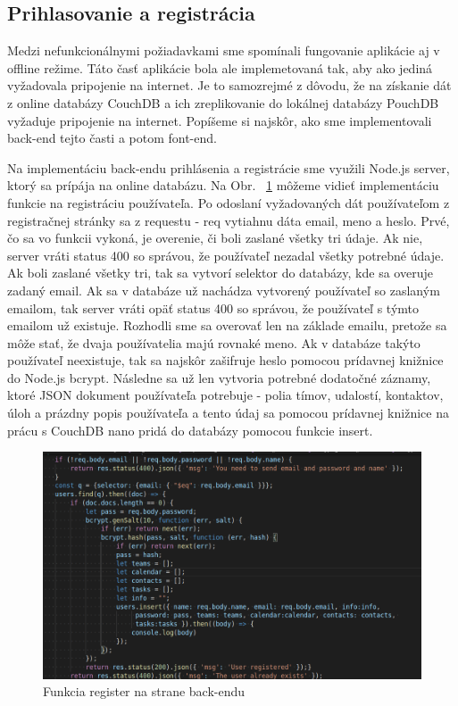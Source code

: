 \subsection{Prihlasovanie a registrácia}
\indent Medzi nefunkcionálnymi požiadavkami sme spomínali fungovanie aplikácie aj v offline režime. Táto časť aplikácie bola ale implemetovaná tak, aby ako jediná vyžadovala pripojenie na internet. Je to samozrejmé z dôvodu, že na získanie dát z online databázy CouchDB a ich zreplikovanie do lokálnej databázy PouchDB vyžaduje pripojenie na internet. Popíšeme si najskôr, ako sme implementovali back-end tejto časti a potom font-end.

\indent Na implementáciu back-endu prihlásenia a registrácie sme využili Node.js server, ktorý sa prípája na online databázu. Na Obr. ~\ref{fig:register_back} môžeme vidieť implementáciu funkcie na registráciu používateľa. Po odoslaní vyžadovaných dát používateľom z registračnej stránky sa z requestu - req vytiahnu dáta email, meno a heslo. Prvé, čo sa vo funkcii vykoná, je overenie, či boli zaslané všetky tri údaje. Ak nie, server vráti status 400 so správou, že používateľ nezadal všetky potrebné údaje. Ak boli zaslané všetky tri, tak sa vytvorí selektor do databázy, kde sa overuje zadaný email. Ak sa v databáze už nachádza vytvorený používateľ so zaslaným emailom, tak server vráti opäť status 400 so správou, že používateľ s týmto emailom už existuje. Rozhodli sme sa overovať len na základe emailu, pretože sa môže stať, že dvaja používatelia majú rovnaké meno. Ak v databáze takýto používateľ neexistuje, tak sa najskôr zašifruje heslo pomocou prídavnej knižnice do Node.js bcrypt. Následne sa už len vytvoria potrebné dodatočné záznamy, ktoré JSON dokument používateľa potrebuje - polia tímov, udalostí, kontaktov, úloh a prázdny popis používateľa a tento údaj sa pomocou prídavnej knižnice na prácu s CouchDB nano pridá do databázy pomocou funkcie insert.
\begin{figure}[H]
    \centering
    \includegraphics[scale=0.45]{img/imp/register_back.png}
    \caption{Funkcia register na strane back-endu}
    \label{fig:register_back}
\end{figure}

